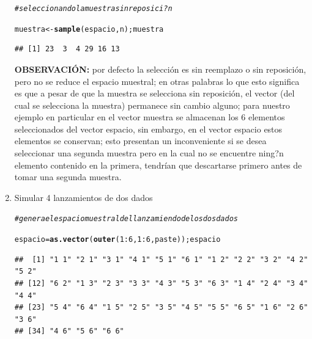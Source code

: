\documentclass[12pt,letterpaper]{article}\usepackage[]{graphicx}\usepackage[]{color}
\makeatletter
\newcommand{\hlnum}[1]{\textcolor[rgb]{0.686,0.059,0.569}{#1}}%
\newcommand{\hlcom}[1]{\textcolor[rgb]{0.678,0.584,0.686}{\textit{#1}}}%
\newcommand{\hlopt}[1]{\textcolor[rgb]{0,0,0}{#1}}%
\newcommand{\hlstd}[1]{\textcolor[rgb]{0.345,0.345,0.345}{#1}}%
\newcommand{\hlkwb}[1]{\textcolor[rgb]{0.69,0.353,0.396}{#1}}%
\newcommand{\hlkwd}[1]{\textcolor[rgb]{0.737,0.353,0.396}{\textbf{#1}}}%
\newenvironment{kframe}{%
 \def\at@end@of@kframe{}%
 \ifinner\ifhmode%
  \def\at@end@of@kframe{\end{minipage}}%
  \begin{minipage}{\columnwidth}%
 \fi\fi%
 \def\FrameCommand##1{\hskip\@totalleftmargin \hskip-\fboxsep
 \colorbox{shadecolor}{##1}\hskip-\fboxsep
     \hskip-\linewidth \hskip-\@totalleftmargin \hskip\columnwidth}%
 \MakeFramed {\advance\hsize-\width
   \@totalleftmargin\z@ \linewidth\hsize
   \@setminipage}}%
 {\par\unskip\endMakeFramed%
 \at@end@of@kframe}
\newenvironment{knitrout}{}{} %
\makeatother
\begin{document}
\begin{enumerate}
\begin{knitrout}
\color{fgcolor}\begin{kframe}
\begin{alltt}
\hlcom{# seleccionando la muestra sin reposici?n}

\hlstd{muestra} \hlkwb{<-} \hlkwd{sample}\hlstd{(espacio, n); muestra}
\end{alltt}
\begin{verbatim}
## [1] 23  3  4 29 16 13
\end{verbatim}
\end{kframe}
\end{knitrout}

\textbf{OBSERVACI\'ON:} por defecto la selecci\'on es sin reemplazo o sin reposici\'on, pero no se reduce el espacio muestral; en otras palabras lo que esto significa es que a pesar de que la muestra se selecciona sin reposici\'on, el vector (del cual se selecciona la muestra) permanece sin cambio alguno; para nuestro ejemplo en particular en el vector muestra se almacenan los 6 elementos seleccionados del vector espacio, sin embargo, en el vector espacio estos elementos se conservan; esto presentan un inconveniente si se desea seleccionar una segunda muestra pero en la cual no se encuentre ning?n elemento contenido en la primera, tendr\'ian que descartarse primero antes de tomar una segunda muestra.\\

\item Simular 4 lanzamientos de dos dados 

\begin{knitrout}
\color{fgcolor}\begin{kframe}
\begin{alltt}
\hlcom{# genera el espacio muestral del lanzamiendo de los dos dados}

\hlstd{espacio} \hlkwb{=} \hlkwd{as.vector}\hlstd{(}\hlkwd{outer}\hlstd{(}\hlnum{1}\hlopt{:}\hlnum{6}\hlstd{,} \hlnum{1}\hlopt{:}\hlnum{6}\hlstd{, paste)); espacio}
\end{alltt}
\begin{verbatim}
##  [1] "1 1" "2 1" "3 1" "4 1" "5 1" "6 1" "1 2" "2 2" "3 2" "4 2" "5 2"
## [12] "6 2" "1 3" "2 3" "3 3" "4 3" "5 3" "6 3" "1 4" "2 4" "3 4" "4 4"
## [23] "5 4" "6 4" "1 5" "2 5" "3 5" "4 5" "5 5" "6 5" "1 6" "2 6" "3 6"
## [34] "4 6" "5 6" "6 6"
\end{verbatim}
\end{kframe}
\end{knitrout}


\end{enumerate}
\end{document}
